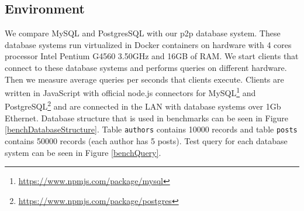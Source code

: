 \subsection{Environment}
We compare MySQL and PostgresSQL with our p2p database system. These database systems run virtualized in Docker containers on hardware with 4 cores processor Intel Pentium G4560 3.50GHz and 16GB of RAM.  We start clients that connect to these database systems and performs queries on different hardware. Then we measure average queries per seconds that clients execute. Clients are written in JavaScript with official node.js connectors for MySQL\footnote{\url{https://www.npmjs.com/package/mysql}} and PostgreSQL\footnote{\url{https://www.npmjs.com/package/postgres}} and are connected in the LAN with database systems over 1Gb Ethernet. Database structure that is used in benchmarks can be seen in Figure \ref{benchDatabaseStructure}. Table \texttt{authors} contains 10000 records and table \texttt{posts} contains 50000 records (each author has 5 posts). Test query for each database system can be seen in Figure \ref{benchQuery}.

